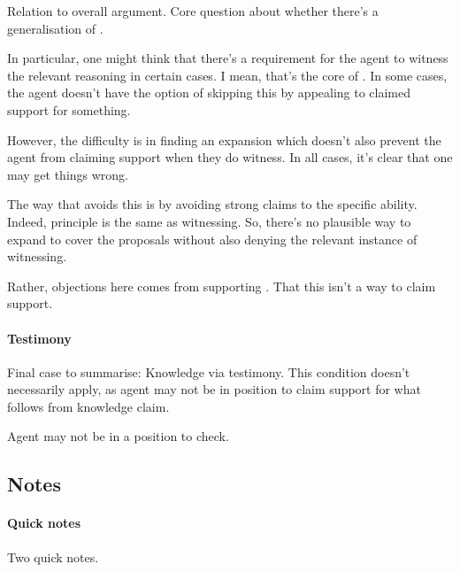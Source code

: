 \begin{note}
  {
    \color{red} Relation to overall argument.
  }
  Core question about whether there's a generalisation of \ideaCS{}.

  In particular, one might think that there's a requirement for the agent to witness the relevant reasoning in certain cases.
  I mean, that's the core of \ideaCS{}.
  In some cases, the agent doesn't have the option of skipping this by appealing to claimed support for something.

  However, the difficulty is in finding an expansion which doesn't also prevent the agent from claiming support when they do witness.
  In all cases, it's clear that one may get things wrong.

  The way that \adB{} avoids this is by avoiding strong claims to the specific ability.
  Indeed, principle is the same as witnessing.
  So, there's no plausible way to expand \ideaCS{} to cover the proposals without also denying the relevant instance of witnessing.

  Rather, objections here comes from supporting \ESU{}.
  That this isn't a way to claim support.
\end{note}

\paragraph{Testimony}

\begin{note}
  Final case to summarise:
  Knowledge via testimony.
  This condition doesn't necessarily apply, as agent may not be in position to claim support for what follows from knowledge claim.

  Agent may not be in a position to check.
\end{note}


\subsection{Notes}
\label{sec:notes}

\paragraph{Quick notes}
\begin{note}
  Two quick notes.
\end{note}

